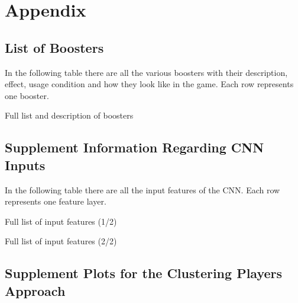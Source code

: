 \chapter{Appendix}
\section{List of Boosters}\label{boosters}
In the following table there are all the various boosters with their description, effect, usage condition and how they look like in the game. Each row represents one booster.
\begin{table}[H]
    \caption{Full list and description of boosters}
    \centering
    \tiny
    
    \label{tab:boosters}
\end{table}

\section{Supplement Information Regarding CNN Inputs}
In the following table there are all the input features of the \ac{CNN}. Each row represents one feature layer.
\FloatBarrier
\begin{table}[H]
    \caption{Full list of input features (1/2)}
    \centering
    \tiny
    
    \label{tab:features_1}
\end{table}

\begin{table}[H]
    \caption{Full list of input features (2/2)}
    \centering
    \tiny
    
    \label{tab:features_2}
\end{table}

    
\section{Supplement Plots for the Clustering Players Approach}
